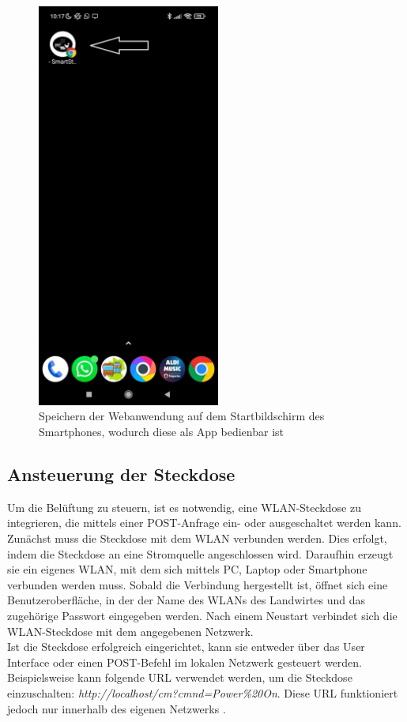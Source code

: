 \documentclass[conference]{IEEEtran}
\begin{document}
\begin{figure}[H]
	\centering
	\includegraphics[width=60mm]{fig/stApp.jpg}
	\caption{Speichern der Webanwendung auf dem Startbildschirm des Smartphones, wodurch diese als App bedienbar ist}
	\label{stApp}
\end{figure}

\subsection{Ansteuerung der Steckdose}
Um die Belüftung zu steuern, ist es notwendig, eine WLAN-Steckdose zu integrieren, die mittels einer POST-Anfrage ein- oder ausgeschaltet werden kann. Zunächst muss die Steckdose mit dem WLAN verbunden werden. Dies erfolgt, indem die Steckdose an eine Stromquelle angeschlossen wird. Daraufhin erzeugt sie ein eigenes WLAN, mit dem sich mittels PC, Laptop oder Smartphone verbunden werden muss. Sobald die Verbindung hergestellt ist, öffnet sich eine Benutzeroberfläche, in der der Name des WLANs des Landwirtes und das zugehörige Passwort eingegeben werden. Nach einem Neustart verbindet sich die WLAN-Steckdose mit dem angegebenen Netzwerk. \\
Ist die Steckdose erfolgreich eingerichtet, kann sie entweder über das User Interface oder einen POST-Befehl im lokalen Netzwerk gesteuert werden. Beispielsweise kann folgende URL verwendet werden, um die Steckdose einzuschalten: \textit{http://localhost/cm?cmnd=Power\%20On}. Diese URL funktioniert jedoch nur innerhalb des eigenen Netzwerks \cite{delock}.
\end{document}
